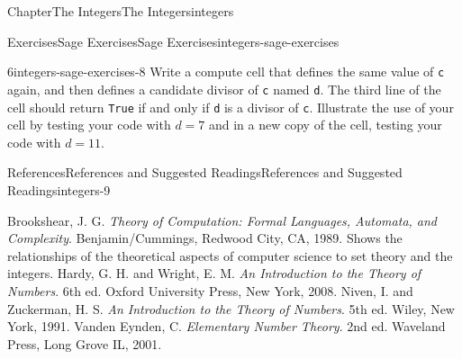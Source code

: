 \documentclass[oneside,10pt,]{book}
\newcommand{\mono}[1]{\texttt{#1}}
\numberwithin{equation}{section}
\begin{document}
\begin{chapterptx}{Chapter}{The Integers}{}{The Integers}{}{}{integers}
\begin{exercises-section}{Exercises}{Sage Exercises}{}{Sage Exercises}{}{}{integers-sage-exercises}
\begin{divisionexercise}{6}{}{}{integers-sage-exercises-8}
Write a compute cell that defines the same value of \mono{c} again, and then defines a candidate divisor of \mono{c} named \mono{d}.  The third line of the cell should return \mono{True} if and only if \mono{d} is a divisor of \mono{c}.  Illustrate the use of your cell by testing your code with \(d=7\) and in a new copy of the cell, testing your code with \(d=11\).%
\end{divisionexercise}%
\end{exercises-section}
%
%
\typeout{************************************************}
\typeout{************************************************}
%
\begin{references-section}{References}{References and Suggested Readings}{}{References and Suggested Readings}{}{}{integers-9}
\begin{referencelist}
\hypertarget{integers-9-2}{} Brookshear, J. G. \textit{Theory of Computation: Formal Languages, Automata, and Complexity}.  Benjamin\slash{}Cummings, Redwood City, CA, 1989. Shows the relationships of the theoretical aspects of computer science to set theory and the integers.
\hypertarget{integers-9-3}{}  Hardy, G. H. and Wright, E. M. \textit{An Introduction to the Theory of Numbers}.  6th ed. Oxford University Press, New York, 2008.
\hypertarget{integers-9-4}{}  Niven, I. and Zuckerman, H. S. \textit{An Introduction to the Theory of Numbers}.  5th ed. Wiley, New York, 1991.
\hypertarget{integers-9-5}{}  Vanden Eynden, C. \textit{Elementary Number Theory}. 2nd ed.  Waveland Press, Long Grove IL, 2001.
\end{referencelist}
\end{references-section}
\end{chapterptx}
%
%
\typeout{************************************************}
\typeout{************************************************}
%
\end{document}
